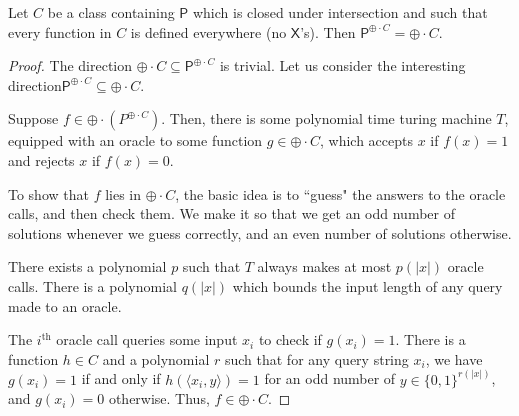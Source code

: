 \documentclass[11pt]{article}
\newcommand{\parity}{\oplus}
\newcommand{\p}{\textsf{P}}
\newcommand{\x}{\textsf{X}}
\begin{document}
\begin{theorem}\label{oracleparityc}
Let $C$ be a class containing \emph{$\p$} which is closed under intersection and such that every function in $C$ is defined everywhere (no \emph{$\x$}'s). Then \emph{$ \p^{\parity \cdot C} = \parity \cdot C$}.
\end{theorem}
\begin{proof}
The direction $\parity \cdot C \subseteq \p^{\parity \cdot C}$ is trivial. Let us consider the interesting direction\linebreak $\p^{\parity \cdot C}\subseteq \parity\cdot C$.

Suppose $f \in \parity \cdot (P^{\parity\cdot C})$. Then, there is some polynomial time turing machine $T$, equipped with an oracle to some function $g\in \parity\cdot C$, which accepts $x$ if $f(x) = 1$ and rejects $x$ if $f(x) = 0$.

To show that $f$ lies in $\parity\cdot C$, the basic idea is to ``guess" the answers to the oracle calls, and then check them. We make it so that we get an odd number of solutions whenever we guess correctly, and an even number of solutions otherwise.

There exists a polynomial $p$ such that $T$ always makes at most $p(|x|)$ oracle calls. There is a polynomial $q(|x|)$ which bounds the input length of any query made to an oracle.

The $i^\text{th}$ oracle call queries some input $x_i$ to check if $g(x_i) = 1$. There is a function $h \in C$ and a polynomial $r$ such that for any query string $x_i$, we have $g(x_i) = 1$ if and only if $h(\langle x_i,y\rangle) = 1$ for an odd number of $y\in\{0,1\}^{r(|x|)}$, and $g(x_i) = 0$ otherwise. Thus, $f \in \parity \cdot C$.


\end{proof}
\end{document}
